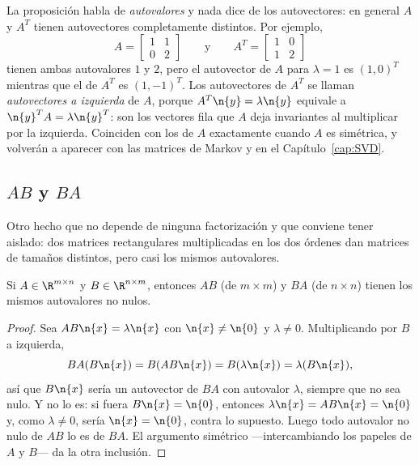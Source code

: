 \begin{remark}\label{obs:autovect-traspuesta}
La proposición habla de \emph{autovalores} y nada dice de los autovectores: en general
$A$ y $A^T$ tienen autovectores completamente distintos. Por ejemplo,
\[
A=\begin{bmatrix}1&1\\ 0&2\end{bmatrix}
\qquad\text{y}\qquad
A^T=\begin{bmatrix}1&0\\ 1&2\end{bmatrix}
\]
tienen ambas autovalores $1$ y $2$, pero el autovector de $A$ para $\lambda=1$ es
$(1,0)^T$ mientras que el de $A^T$ es $(1,-1)^T$. Los autovectores de $A^T$ se llaman
\emph{autovectores a izquierda} de $A$, porque $A^T\n{y}=\lambda\n{y}$ equivale a
$\n{y}^TA=\lambda\n{y}^T$: son los vectores fila que $A$ deja invariantes al
multiplicar por la izquierda. Coinciden con los de $A$ exactamente cuando $A$ es
simétrica, y volverán a aparecer con las matrices de Markov y en el
Capítulo~\ref{cap:SVD}.
\end{remark}

\subsection{$AB$ y $BA$}
\label{sec:AB-BA}

Otro hecho que no depende de ninguna factorización y que conviene tener
aislado: dos matrices rectangulares multiplicadas en los dos órdenes dan
matrices de tamaños distintos, pero casi los mismos autovalores.

\begin{prop}\label{prop:AB-BA}
Si $A\in\R^{m\times n}$ y $B\in\R^{n\times m}$, entonces $AB$ (de
$m\times m$) y $BA$ (de $n\times n$) tienen los mismos autovalores no nulos.
\end{prop}

\begin{proof}
Sea $AB\n{x}=\lambda\n{x}$ con $\n{x}\neq\n{0}$ y $\lambda\neq0$.
Multiplicando por $B$ a izquierda,
\[
BA(B\n{x})=B(AB\n{x})=B(\lambda\n{x})=\lambda(B\n{x}) ,
\]
así que $B\n{x}$ sería un autovector de $BA$ con autovalor $\lambda$, siempre
que no sea nulo. Y no lo es: si fuera $B\n{x}=\n{0}$, entonces
$\lambda\n{x}=AB\n{x}=\n{0}$ y, como $\lambda\neq0$, sería $\n{x}=\n{0}$,
contra lo supuesto. Luego todo autovalor no nulo de $AB$ lo es de $BA$. El
argumento simétrico ---intercambiando los papeles de $A$ y $B$--- da la otra
inclusión.
\end{proof}

